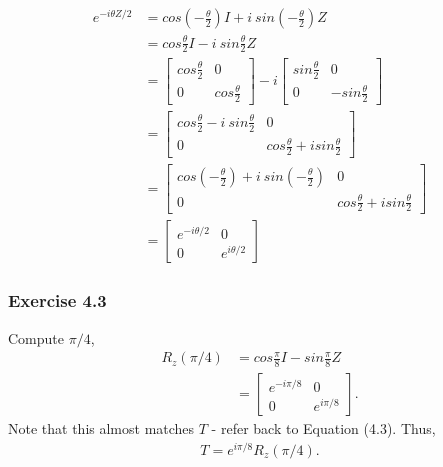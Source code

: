 \begin{align}
    e^{-i \theta Z / 2} &= cos( - \frac \theta 2) I + i\ sin( - \frac \theta 2) Z \\
    &= cos \frac \theta 2 I - i\ sin \frac \theta 2 Z \\
    &= \left[ \begin{matrix} cos \frac \theta 2 & 0 \\ 0 & cos \frac \theta 2 \end{matrix} \right] - i
        \left[ \begin{matrix} sin \frac \theta 2 & 0 \\ 0 & - sin \frac \theta 2\end{matrix} \right] \\
    &= \left[ \begin{matrix} cos \frac \theta 2 - i\ sin \frac \theta 2 & 0 \\
        0 & cos \frac \theta 2 + i sin \frac \theta 2 \end{matrix} \right] \\
    &= \left[ \begin{matrix} cos(- \frac \theta 2) + i\ sin(- \frac \theta 2) & 0 \\
        0 & cos \frac \theta 2 + i sin \frac \theta 2 \end{matrix} \right] \\
    &= \left[ \begin{matrix} e^{-i \theta/2} & 0 \\ 0 & e^{i \theta/2} \end{matrix} \right]
\end{align}


\subsubsection{Exercise 4.3}
Compute $\pi/4$,
\begin{align}
    R_z(\pi/4) &= cos \frac{\pi}{8} I - sin \frac{\pi}{8} Z \\
    &= \left[ \begin{matrix} e^{-i \pi/8} & 0 \\ 0 & e^{i \pi/8} \end{matrix} \right].
\end{align}
Note that this almost matches $T$ - refer back to Equation (4.3).
Thus,
\begin{align}
    T = e^{i \pi/8} R_z(\pi/4).
\end{align}

